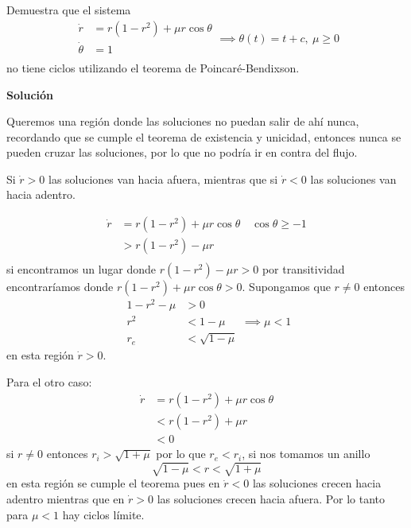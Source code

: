 \begin{ejemplo} Demuestra que el sistema \label{ejemplopoincare2}
  $$
  \begin{aligned}
    \dot{r} &= r(1-r^2)+\mu r \cos\theta \\ 
    \dot{\theta} &= 1 \\ 
  \end{aligned}
  \implies\theta(t) = t+c ,\ \mu \ge 0
  $$
  no tiene ciclos utilizando el teorema de Poincaré-Bendixson.

  \begin{tcolorbox}[colback=Black!4, colframe=White, arc = 2mm]
  \textbf{Solución}
 
  Queremos una región donde las soluciones no puedan salir de ahí nunca, recordando que se cumple el teorema de existencia y unicidad, entonces nunca se pueden cruzar las soluciones, por lo que no podría ir en contra del flujo.

Si $\dot{r}>0$ las soluciones van hacia afuera, mientras que si $\dot{r}<0$ las soluciones van hacia adentro.

$$
\begin{aligned}
  \dot{r} &= r(1-r^2)+\mu r \cos\theta \quad \cos\theta \ge -1\\
	  &> r(1-r^2)-\mu r \\
\end{aligned}
$$
  si encontramos un lugar donde $r(1-r^2)-\mu r >0$ por transitividad encontraríamos donde $r(1-r^2)+\mu r \cos\theta>0$. Supongamos que $r \neq 0$ entonces $$
  \begin{aligned}
    1-r^2-\mu&>0 \\
    r^2 &< 1-\mu \\
    r_e &< \sqrt{1-\mu}
  \end{aligned} \implies \mu<1
  $$
  en esta región $\dot{r}>0$.

  Para el otro caso:
  $$
  \begin{aligned}
    \dot{r} &= r(1-r^2)+\mu r \cos\theta \\
	    &< r(1-r^2) + \mu r \\
	    &< 0
  \end{aligned}
  $$
  si $r\neq 0$ entonces  $r_i > \sqrt{1+\mu}$ por lo que $r_e < r_i$, si nos tomamos un anillo  $$
    \sqrt{1-\mu} < r < \sqrt{1+\mu} 
  $$
  en esta región se cumple el teorema pues en $\dot{r}<0$ las soluciones crecen hacia adentro mientras que en $\dot{r}>0$ las soluciones crecen hacia afuera. Por lo tanto para $\mu<1$ hay ciclos límite.  
  \end{tcolorbox} 


\end{ejemplo}
